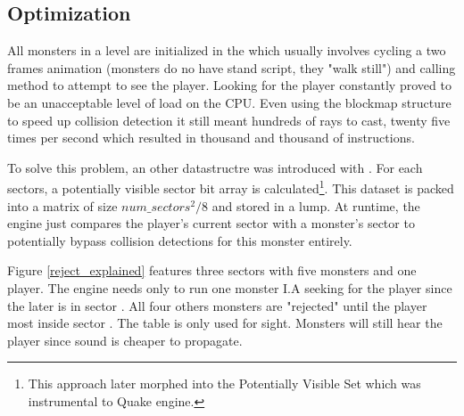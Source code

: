\subsection{Optimization}
All monsters in a level are initialized in the  which usually involves cycling a two frames animation (monsters do no have stand script, they "walk still") and calling  method to attempt to see the player. Looking for the player constantly proved to be an unacceptable level of load on the CPU. Even using the blockmap structure to speed up collision detection it still meant hundreds of rays to cast, twenty five times per second which resulted in thousand and thousand of instructions.\\
\par
To solve this problem, an other datastructre was introduced with . For each sectors, a potentially visible sector bit array is calculated\footnote{This approach later morphed into the Potentially Visible Set which was instrumental to Quake engine.}. This dataset is packed into a matrix of size $num\_sectors^2/8$ and stored in a  lump. At runtime, the engine just compares the player's current sector with a monster's sector to potentially bypass collision detections for this monster entirely.\\
\par
{}
Figure \ref{reject_explained} features three sectors with five monsters and one player. The engine needs only to run one monster I.A seeking for the player since the later is in sector . All four others monsters are "rejected" until the player most inside sector . The table is only used for sight. Monsters will still hear the player since sound is cheaper to propagate.\\
\par
{}






